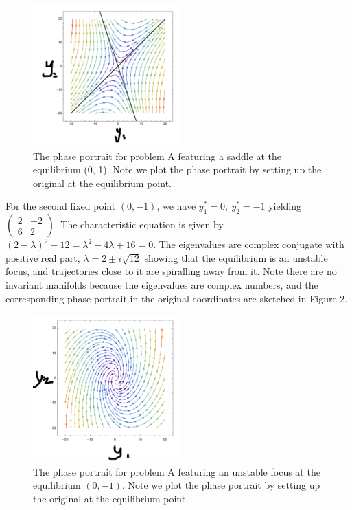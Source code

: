 \documentclass[11pt,a4paper,twoside]{article}
\begin{document}
	\begin{figure}[H]
		\centering
		\includegraphics[width=0.5\textwidth]{figure/pdf27f1.PNG}
		\caption{ The phase portrait for problem A featuring a saddle at the equilibrium (0, 1). Note we plot the phase portrait by setting up the original at the equilibrium point.}
	\end{figure}
	For the second fixed point $(0, -1)$, we have $y_1^* = 0,\ y_2^* = -1$ yielding
	$
	\begin{pmatrix}
		2 & -2\\
		6 & 2
	\end{pmatrix}
	$.
	The characteristic equation is given by $(2 - \lambda)^2 - 12 = \lambda^2 - 4\lambda + 16 = 0$. The eigenvalues are complex conjugate with positive real part, $\lambda = 2\pm i\sqrt{12}$ showing that the equilibrium is an unstable focus, and trajectories close to it are spiralling away from it. Note there are no invariant manifolds because the eigenvalues are complex numbers, and the corresponding phase portrait in the original coordinates are sketched in Figure 2.
	\begin{figure}[H]
		\centering
		\includegraphics[width=0.5\textwidth]{figure/pdf27f2.PNG}
		\caption{The phase portrait for problem A featuring an unstable focus at the equilibrium $(0, -1)$. Note we plot the phase portrait by setting up the original at the equilibrium point}
	\end{figure}
\end{document}
